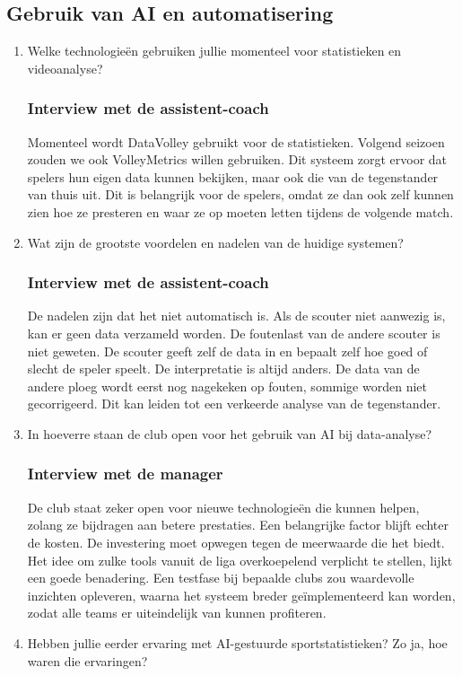 \subsection{Gebruik van AI en automatisering}
\begin{enumerate}
  \item Welke technologieën gebruiken jullie momenteel voor statistieken en videoanalyse?
  \subsubsection{Interview met de assistent-coach}
  Momenteel wordt DataVolley gebruikt voor de statistieken. Volgend seizoen zouden we ook VolleyMetrics willen gebruiken. Dit systeem zorgt ervoor dat spelers hun eigen data kunnen bekijken, maar ook die van de tegenstander van thuis uit. Dit is belangrijk voor de spelers, omdat ze dan ook zelf kunnen zien hoe ze presteren en waar ze op moeten letten tijdens de volgende match.
  \item Wat zijn de grootste voordelen en nadelen van de huidige systemen?
  \subsubsection{Interview met de assistent-coach}
  De nadelen zijn dat het niet automatisch is. Als de scouter niet aanwezig is, kan er geen data verzameld worden. De foutenlast van de andere scouter is niet geweten. De scouter geeft zelf de data in en bepaalt zelf hoe goed of slecht de speler speelt. De interpretatie is altijd anders. De data van de andere ploeg wordt eerst nog nagekeken op fouten, sommige worden niet gecorrigeerd. Dit kan leiden tot een verkeerde analyse van de tegenstander.
  \item In hoeverre staan de club open voor het gebruik van AI bij data-analyse?
  \subsubsection{Interview met de manager}
  De club staat zeker open voor nieuwe technologieën die kunnen helpen, zolang ze bijdragen aan betere prestaties. Een belangrijke factor blijft echter de kosten. De investering moet opwegen tegen de meerwaarde die het biedt. Het idee om zulke tools vanuit de liga overkoepelend verplicht te stellen, lijkt een goede benadering. Een testfase bij bepaalde clubs zou waardevolle inzichten opleveren, waarna het systeem breder geïmplementeerd kan worden, zodat alle teams er uiteindelijk van kunnen profiteren.
  \item Hebben jullie eerder ervaring met AI-gestuurde sportstatistieken? Zo ja, hoe waren die ervaringen?

\end{enumerate}
